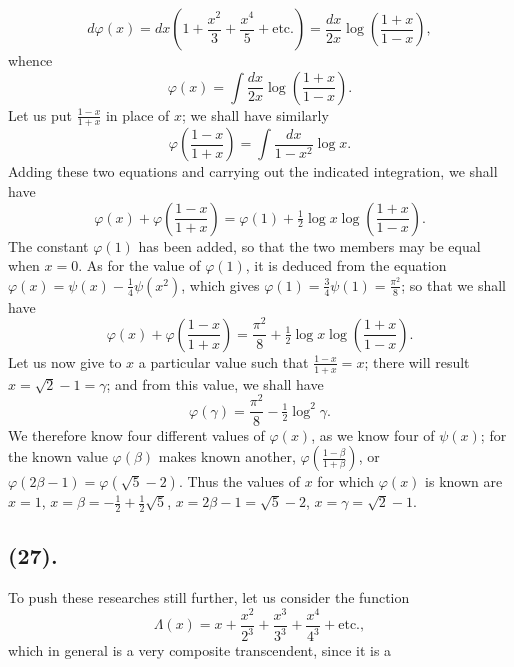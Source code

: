 \documentclass{article}
\begin{document}
\[ d\varphi(x)=dx\left(1+\frac{x^{2}}{3}+\frac{x^{4}}{5}+\text{etc.}\right)=\frac{dx}{2x}\log\left(\frac{1+x}{1-x}\right), \]
whence
\[ \varphi(x)=\int\frac{dx}{2x}\log\left(\frac{1+x}{1-x}\right). \]
Let us put $\frac{1-x}{1+x}$ in place of $x$; we shall have similarly
\[ \varphi\left(\frac{1-x}{1+x}\right)=\int\frac{dx}{1-x^{2}}\log x. \]
Adding these two equations and carrying out the indicated integration, we shall have
\[ \varphi(x)+\varphi\left(\frac{1-x}{1+x}\right)=\varphi(1)+\tfrac{1}{2}\log x\log\left(\frac{1+x}{1-x}\right). \]
The constant $\varphi(1)$ has been added, so that the two members may be equal when $x=0$. As for the value of $\varphi(1)$, it is deduced from the equation $\varphi(x)=\psi(x)-\frac{1}{4}\psi(x^{2})$, which gives $\varphi(1)=\frac{3}{4}\psi(1)=\frac{\pi^{2}}{8}$; so that we shall have
\[ \varphi(x)+\varphi\left(\frac{1-x}{1+x}\right)=\frac{\pi^{2}}{8}+\tfrac{1}{2}\log x\log\left(\frac{1+x}{1-x}\right). \]
Let us now give to $x$ a particular value such that $\frac{1-x}{1+x}=x$; there will result $x=\sqrt{2}-1=\gamma$; and from this value, we shall have
\[ \varphi(\gamma)=\frac{\pi^{2}}{8}-\tfrac{1}{2}\log^{2}\gamma. \]
We therefore know four different values of $\varphi(x)$, as we know four of $\psi(x)$; for the known value $\varphi(\beta)$ makes known another, $\varphi\left(\frac{1-\beta}{1+\beta}\right)$, or $\varphi(2\beta-1)=\varphi(\sqrt{5}-2)$. Thus the values of $x$ for which $\varphi(x)$ is known are $x=1$, $x=\beta=-\frac{1}{2}+\frac{1}{2}\sqrt{5}$, $x=2\beta-1=\sqrt{5}-2$, $x=\gamma=\sqrt{2}-1$.

\subsection*{(27).}

To push these researches still further, let us consider the function
\[ \Lambda(x)=x+\frac{x^{2}}{2^{3}}+\frac{x^{3}}{3^{3}}+\frac{x^{4}}{4^{3}}+\text{etc.}, \]
which in general is a very composite transcendent, since it is a
\end{document}
